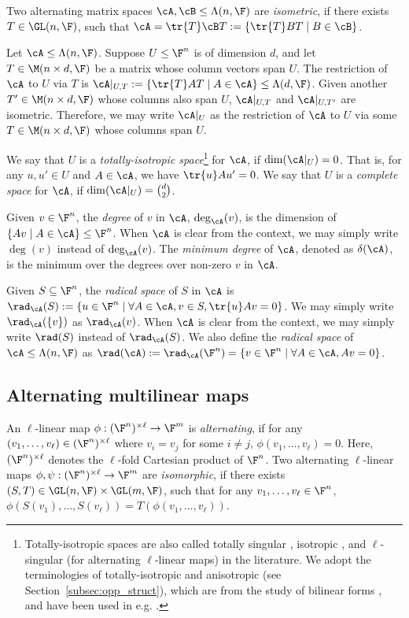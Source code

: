 %
%
%

Two alternating matrix spaces $\cA, \cB\leq \Lambda(n, \F)$ are \emph{isometric}, 
if there exists $T\in\GL(n, \F)$, such that 
$\cA=\tr{T}\cB T:=\{\tr{T}BT \mid B\in\cB\}$.

Let $\cA\leq\Lambda(n, \F)$. Suppose $U\leq \F^n$ is of dimension $d$, 
%
%
%
%
%
%
%
%
%
and let $T\in \M(n\times d, \F)$ be a matrix whose column 
vectors span $U$. The restriction of $\cA$ to $U$ via $T$ is $\cA|_{U, 
T}:=\{\tr{T}AT \mid A\in \cA\}\leq \Lambda(d, \F)$. Given another $T'\in\M(n\times 
d,\F)$ whose columns 
also 
span $U$, $\cA|_{U, T}$ and $\cA|_{U, T'}$ are isometric. Therefore, we may write 
$\cA|_U$ as the restriction of $\cA$ to $U$ via some $T\in\M(n\times d, \F)$ whose 
columns span $U$.

We say that $U$ is a \emph{totally-isotropic space}\footnote{Totally-isotropic 
spaces are also called totally singular \cite{Atk73}, isotropic \cite{BGH87}, 
and $\ell$-singular 
\cite{DS10} (for alternating $\ell$-linear maps) in the literature. We 
adopt the terminologies of totally-isotropic and 
anisotropic (see 
Section~\ref{subsec:opp_struct}), which are from the study of bilinear forms 
\cite{MH73}, and have been used in e.g. \cite{BMW17}. } for $\cA$, if 
$\dim(\cA|_U)=0$. That is, for any $u, u'\in U$ and $A\in \cA$, we have 
$\tr{u}Au'=0$. 
We say that $U$ is a \emph{complete space} for $\cA$, if 
$\dim(\cA|_U)=\binom{d}{2}$. 

Given $v\in \F^n$, the \emph{degree} of $v$ in $\cA$, $\deg_\cA(v)$, is the 
dimension of $\{ Av \mid A\in \cA\}\leq \F^n$. When $\cA$ is clear from the 
context, 
we may simply write $\deg(v)$ instead of $\deg_\cA(v)$. The \emph{minimum degree} 
of $\cA$, denoted as $\delta(\cA)$, is the minimum over the degrees over non-zero 
$v$ in $\cA$. 

Given $S\subseteq \F^n$, the \emph{radical space} of $S$ in $\cA$ is 
$\rad_\cA(S):=\{u\in \F^n \mid \forall A\in \cA, v\in S, \tr{u}Av=0\}$. We may 
simply 
write $\rad_\cA(\{v\})$ as $\rad_\cA(v)$. When $\cA$ is 
clear from the context, we may simply write $\rad(S)$ instead of $\rad_\cA(S)$. We 
also define the \emph{radical space} of $\cA\leq \Lambda(n, \F)$ as
$\rad(\cA):=\rad_\cA(\F^n)=\{v\in \F^n \mid \forall A\in\cA, Av=0\}$.

\subsection{Alternating multilinear maps} An $\ell$-linear map 
$\phi:(\F^n)^{\times \ell}\to \F^m$ is \emph{alternating}, if for any $(v_1, 
\dots, 
v_\ell)\in (\F^n)^{\times \ell}$ where $v_i=v_j$ for some $i\neq j$, $\phi(v_1, 
\dots, v_\ell)=0$.
Here, $(\F^n)^{\times \ell}$ denotes 
the $\ell$-fold Cartesian product of $\F^n$. Two alternating $\ell$-linear maps 
$\phi, \psi: (\F^n)^{\times \ell}\to \F^m$ are \emph{isomorphic}, if there exists 
$(S, 
T)\in\GL(n, \F)\times\GL(m, \F)$, such that for any $v_1, \dots, v_\ell\in \F^n$, 
$\phi(S(v_1), \dots, S(v_\ell))=T(\phi(v_1, \dots, v_\ell))$. 


